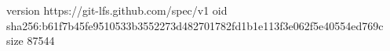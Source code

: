 version https://git-lfs.github.com/spec/v1
oid sha256:b61f7b45fe9510533b3552273d482701782fd1b1e113f3e062f5e40554ed769c
size 87544
